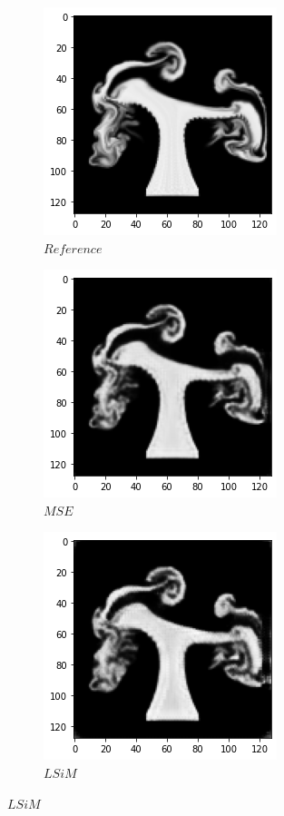 \documentclass[a4paper,12pt,twoside]{report}
\begin{document}
\begin{figure}
	\centering
	\begin{subfigure}{0.19\textwidth}
		\centering
		\includegraphics[scale=0.29]{autoencoder/ref2.png}
		\caption{$Reference$}
	\end{subfigure}
	\begin{subfigure}{0.19\textwidth}
		\centering
		\includegraphics[scale=0.29]{autoencoder/mse2.png}
		\caption{$MSE$}
	\end{subfigure}
	\begin{subfigure}{0.19\textwidth}
		\centering
		\includegraphics[scale=0.29]{autoencoder/lsim2.png}
		\caption{$LSiM$}

\end{subfigure}
\end{figure}
\end{document}
